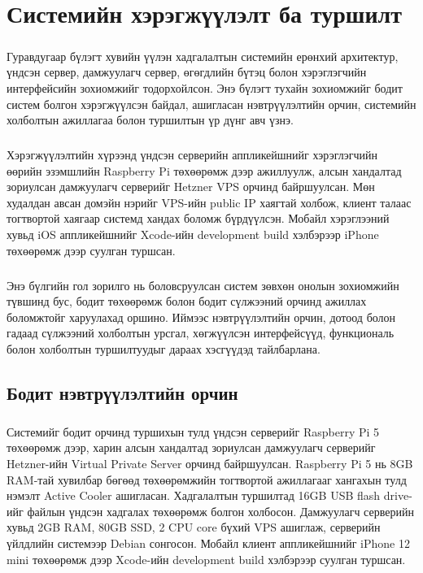
\chapter{Системийн хэрэгжүүлэлт ба туршилт}
\label{Chapter4}

\paragraph{}
Гуравдугаар бүлэгт хувийн үүлэн хадгалалтын системийн ерөнхий архитектур, үндсэн сервер, дамжуулагч сервер, өгөгдлийн бүтэц болон хэрэглэгчийн интерфейсийн зохиомжийг тодорхойлсон. Энэ бүлэгт тухайн зохиомжийг бодит систем болгон хэрэгжүүлсэн байдал, ашигласан нэвтрүүлэлтийн орчин, системийн холболтын ажиллагаа болон туршилтын үр дүнг авч үзнэ.

\paragraph{}
Хэрэгжүүлэлтийн хүрээнд үндсэн серверийн аппликейшнийг хэрэглэгчийн өөрийн эзэмшлийн Raspberry Pi төхөөрөмж дээр ажиллуулж, алсын хандалтад зориулсан дамжуулагч серверийг Hetzner VPS орчинд байршуулсан. Мөн худалдан авсан домэйн нэрийг VPS-ийн public IP хаягтай холбож, клиент талаас тогтвортой хаягаар системд хандах боломж бүрдүүлсэн. Мобайл хэрэглээний хувьд iOS аппликейшнийг Xcode-ийн development build хэлбэрээр iPhone төхөөрөмж дээр суулган туршсан.

\paragraph{}
Энэ бүлгийн гол зорилго нь боловсруулсан систем зөвхөн онолын зохиомжийн түвшинд бус, бодит төхөөрөмж болон бодит сүлжээний орчинд ажиллах боломжтойг харуулахад оршино. Иймээс нэвтрүүлэлтийн орчин, дотоод болон гадаад сүлжээний холболтын урсгал, хөгжүүлсэн интерфейсүүд, функциональ болон холболтын туршилтуудыг дараах хэсгүүдэд тайлбарлана.

\section{Бодит нэвтрүүлэлтийн орчин}

\paragraph{}
Системийг бодит орчинд туршихын тулд үндсэн серверийг Raspberry Pi 5 төхөөрөмж дээр, харин алсын хандалтад зориулсан дамжуулагч серверийг Hetzner-ийн Virtual Private Server орчинд байршуулсан. Raspberry Pi 5 нь 8GB RAM-тай хувилбар бөгөөд төхөөрөмжийн тогтвортой ажиллагааг хангахын тулд нэмэлт Active Cooler ашигласан. Хадгалалтын туршилтад 16GB USB flash drive-ийг файлын үндсэн хадгалах төхөөрөмж болгон холбосон. Дамжуулагч серверийн хувьд 2GB RAM, 80GB SSD, 2 CPU core бүхий VPS ашиглаж, серверийн үйлдлийн системээр Debian сонгосон. Мобайл клиент аппликейшнийг iPhone 12 mini төхөөрөмж дээр Xcode-ийн development build хэлбэрээр суулган туршсан.

